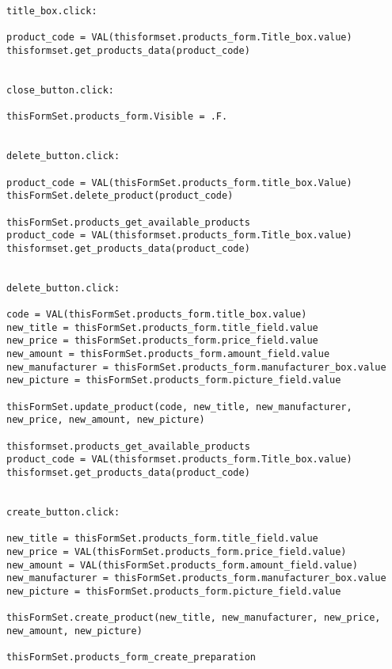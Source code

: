 \begin{lstlisting}[caption=products\_form procedures]
title_box.click:

product_code = VAL(thisformset.products_form.Title_box.value)
thisformset.get_products_data(product_code)


close_button.click:

thisFormSet.products_form.Visible = .F.


delete_button.click:

product_code = VAL(thisFormSet.products_form.title_box.Value)
thisFormSet.delete_product(product_code)

thisFormSet.products_get_available_products
product_code = VAL(thisformset.products_form.Title_box.value)
thisformset.get_products_data(product_code)


delete_button.click:

code = VAL(thisFormSet.products_form.title_box.value)
new_title = thisFormSet.products_form.title_field.value
new_price = thisFormSet.products_form.price_field.value
new_amount = thisFormSet.products_form.amount_field.value
new_manufacturer = thisFormSet.products_form.manufacturer_box.value
new_picture = thisFormSet.products_form.picture_field.value

thisFormSet.update_product(code, new_title, new_manufacturer, new_price, new_amount, new_picture) 

thisformset.products_get_available_products
product_code = VAL(thisformset.products_form.Title_box.value)
thisformset.get_products_data(product_code)


create_button.click:

new_title = thisFormSet.products_form.title_field.value
new_price = VAL(thisFormSet.products_form.price_field.value)
new_amount = VAL(thisFormSet.products_form.amount_field.value)
new_manufacturer = thisFormSet.products_form.manufacturer_box.value
new_picture = thisFormSet.products_form.picture_field.value

thisFormSet.create_product(new_title, new_manufacturer, new_price, new_amount, new_picture) 

thisFormSet.products_form_create_preparation
\end{lstlisting}

